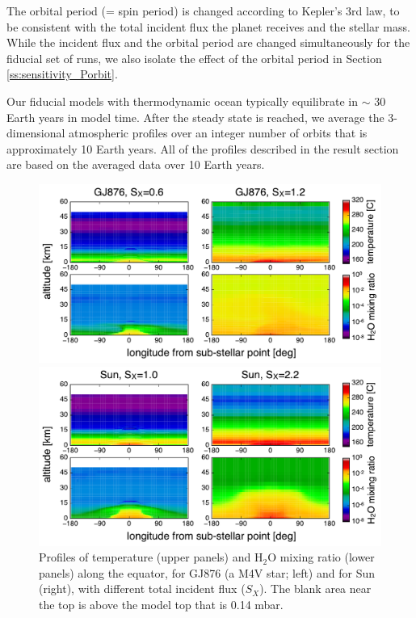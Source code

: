 \documentclass[11pt,numberedappendix,twocolappendix,]{emulateapj}
\def\water{H$_2$O }
\begin{document}
The orbital period (= spin period) is changed according to Kepler's 3rd law, to be consistent with the total incident flux the planet receives and the stellar mass. While the incident flux and the orbital period are changed simultaneously for the fiducial set of runs, we also isolate the effect of the orbital period in Section \ref{ss:sensitivity_Porbit}. 

Our fiducial models with thermodynamic ocean typically equilibrate in  $\sim $ 30 Earth years in model time. 
After the steady state is reached, we average the 3-dimensional atmospheric profiles over an integer number of orbits that is approximately 10 Earth years. 
All of the profiles described in the result section are based on the averaged data over 10 Earth years. 


\begin{figure}[tb]
    \begin{minipage}{0.5\hsize}
\includegraphics[width=\hsize]{fig/AqOH0TLS_GJ876_temp_xH2O.pdf}
    \end{minipage}
    \begin{minipage}{0.5\hsize}
\includegraphics[width=\hsize]{fig/AqOH0TLS_Sun_temp_xH2O.pdf}
    \end{minipage}
    \caption{Profiles of temperature (upper panels) and \water mixing ratio (lower panels) along the equator, for GJ876 (a M4V star; left) and for Sun (right), with different total incident flux ($S_X$). The blank area near the top is above the model top that is  0.14 mbar. }
\label{fig:3Dprofile_equator}
\end{figure}
\end{document}
